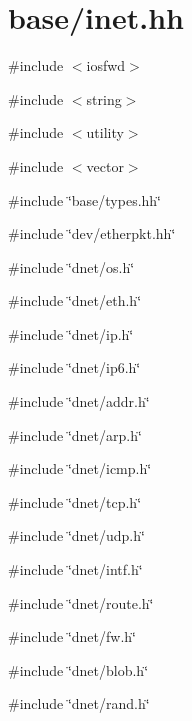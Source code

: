 \hypertarget{inet_8hh}{
\section{base/inet.hh}
\label{inet_8hh}
}
{\ttfamily \#include $<$iosfwd$>$}\par
{\ttfamily \#include $<$string$>$}\par
{\ttfamily \#include $<$utility$>$}\par
{\ttfamily \#include $<$vector$>$}\par
{\ttfamily \#include \char`\"{}base/types.hh\char`\"{}}\par
{\ttfamily \#include \char`\"{}dev/etherpkt.hh\char`\"{}}\par
{\ttfamily \#include \char`\"{}dnet/os.h\char`\"{}}\par
{\ttfamily \#include \char`\"{}dnet/eth.h\char`\"{}}\par
{\ttfamily \#include \char`\"{}dnet/ip.h\char`\"{}}\par
{\ttfamily \#include \char`\"{}dnet/ip6.h\char`\"{}}\par
{\ttfamily \#include \char`\"{}dnet/addr.h\char`\"{}}\par
{\ttfamily \#include \char`\"{}dnet/arp.h\char`\"{}}\par
{\ttfamily \#include \char`\"{}dnet/icmp.h\char`\"{}}\par
{\ttfamily \#include \char`\"{}dnet/tcp.h\char`\"{}}\par
{\ttfamily \#include \char`\"{}dnet/udp.h\char`\"{}}\par
{\ttfamily \#include \char`\"{}dnet/intf.h\char`\"{}}\par
{\ttfamily \#include \char`\"{}dnet/route.h\char`\"{}}\par
{\ttfamily \#include \char`\"{}dnet/fw.h\char`\"{}}\par
{\ttfamily \#include \char`\"{}dnet/blob.h\char`\"{}}\par
{\ttfamily \#include \char`\"{}dnet/rand.h\char`\"{}}\par
